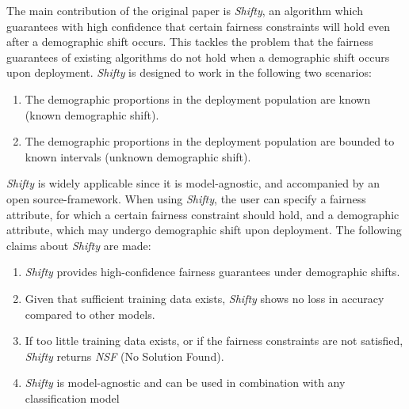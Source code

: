 The main contribution of the original paper \cite{giguere2022} is \textit{Shifty}, an algorithm which guarantees with high confidence that certain fairness constraints will hold even after a demographic shift occurs. This tackles the problem that the fairness guarantees of existing algorithms \cite{thomas2019, agarwal2018} do not hold when a demographic shift occurs upon deployment. \textit{Shifty} is designed to work in the following two scenarios: 

\begin{enumerate}
    \item The demographic proportions in the deployment population are known (known demographic shift).  
    \item The demographic proportions in the deployment population are bounded to known intervals (unknown demographic shift).
\end{enumerate}

\textit{Shifty} is widely applicable since it is model-agnostic, and accompanied by an open source-framework. When using \textit{Shifty}, the user can specify a fairness attribute, for which a certain fairness constraint should hold, and a demographic attribute, which may undergo demographic shift upon deployment. The following claims about \textit{Shifty} are made: 

\begin{enumerate}
    \item  \textit{Shifty} provides high-confidence fairness guarantees under demographic shifts.
    \item  Given that sufficient training data exists, \textit{Shifty} shows no loss in accuracy compared to other models.
    \item  If too little training data exists, or if the fairness constraints are not satisfied, \textit{Shifty} returns \textit{NSF} (No Solution Found).
    \item \textit{Shifty} is model-agnostic and can be used in combination with any classification model
\end{enumerate}



